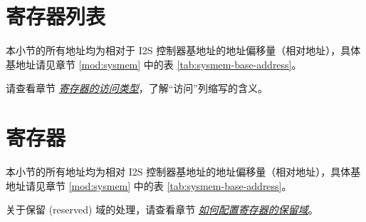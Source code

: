 \documentclass[main\_\_CN.tex]{subfiles}
\begin{document}

\clearpage
\hypertarget{i2s-reg-summ}{}
\section{寄存器列表}
\label{sec:i2s-reg-summ}

本小节的所有地址均为相对于 I2S 控制器基地址的地址偏移量（相对地址），具体基地址请见章节 \ref{mod:sysmem} \textit{} 中的表 \ref{tab:sysmem-base-address}。

请查看章节 \hyperref[glossary-access-types]{\textit{寄存器的访问类型}}，了解“访问”列缩写的含义。






\clearpage
\section{寄存器}

本小节的所有地址均为相对 I2S 控制器基地址的地址偏移量（相对地址），具体基地址请见章节 \ref{mod:sysmem} \textit{} 中的表 \ref{tab:sysmem-base-address}。

关于保留 (reserved) 域的处理，请查看章节 \hyperref[programming-reserved-field]{\textit{如何配置寄存器的保留域}}。


\end{document}

